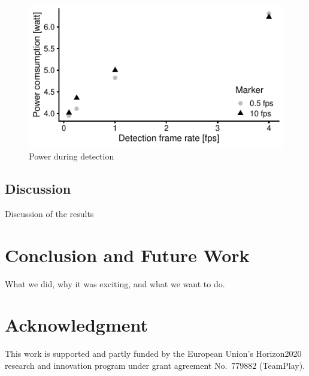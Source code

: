 \documentclass[conference]{IEEEtran}
\begin{document}
\begin{figure}
\centering
\includegraphics{data_visualization/PowerDetection.pdf}
\caption{Power during detection}
\label{figPowerDuringDetection}
\end{figure}


\subsection{Discussion}

Discussion of the results

\section{Conclusion and Future Work}
\label{sec:conclusion}

What we did, why it was exciting, and what we want to do.

\section*{Acknowledgment}

This work is supported and partly funded by the European Union’s
Horizon2020 research and innovation program under grant agreement
No.~779882 (TeamPlay).


 
\vspace{1ex}
\end{document}
